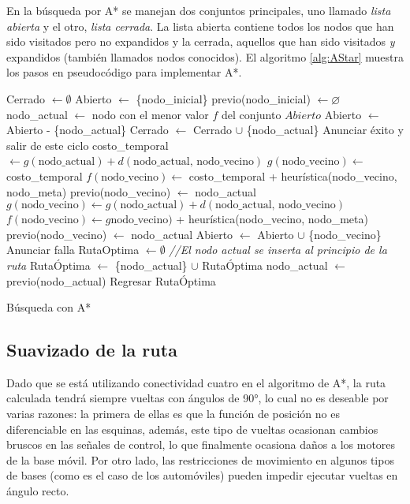 \documentclass[letterpaper,12pt]{article}
\begin{document}
En la búsqueda por A* se manejan dos conjuntos principales, uno llamado \textit{lista abierta} y el otro, \textit{lista cerrada}. La lista abierta contiene todos los nodos que han sido visitados pero no expandidos y la cerrada, aquellos que han sido visitados \textit{y} expandidos (también llamados nodos conocidos). El algoritmo \ref{alg:AStar} muestra los pasos en pseudocódigo para implementar A*. 
\begin{algorithm}
\DontPrintSemicolon
{}
Cerrado $\leftarrow \emptyset$\;
Abierto $\leftarrow$ \{nodo\_inicial\}\;
previo(nodo\_inicial) $\leftarrow \varnothing$\;
{
  nodo\_actual $\leftarrow$ nodo con el menor valor $f$ del conjunto $Abierto$\;
  Abierto $\leftarrow$ Abierto - \{nodo\_actual\}\;
  Cerrado $\leftarrow$ Cerrado $\cup$ \{nodo\_actual\}\;
  {
    Anunciar éxito y salir de este ciclo\;
  }
  {
    {
      costo\_temporal $\leftarrow g(\textrm{nodo\_actual}) + d(\textrm{nodo\_actual, nodo\_vecino})$\;
      {
        $g(\textrm{nodo\_vecino})\leftarrow$ costo\_temporal\;
        $f(\textrm{nodo\_vecino})\leftarrow$ costo\_temporal + heurística(nodo\_vecino, nodo\_meta)\;
        previo(nodo\_vecino) $\leftarrow$ nodo\_actual\;
      }
    }
    {
      $g(\textrm{nodo\_vecino})\leftarrow g(\textrm{nodo\_actual}) + d(\textrm{nodo\_actual, nodo\_vecino})$\;
      $f(\textrm{nodo\_vecino})\leftarrow g\textrm{nodo\_vecino})$  + heurística(nodo\_vecino, nodo\_meta)\;
      previo(nodo\_vecino) $\leftarrow$ nodo\_actual\;
      Abierto $\leftarrow$ Abierto $\cup$ \{nodo\_vecino\}\; 
    }
  }
}
{
  Anunciar falla\;
}
{
  RutaOptima $\leftarrow\emptyset$ \;
  {
    \textit{//El nodo actual se inserta al principio de la ruta}\;
    RutaÓptima $\leftarrow$ \{nodo\_actual\} $\cup$ RutaÓptima \;
    nodo\_actual $\leftarrow$ previo(nodo\_actual)\;
  }
  Regresar RutaÓptima
}
\caption{Búsqueda con A*}
\label{alg:AStar}
\end{algorithm}

\subsection{Suavizado de la ruta}
Dado que se está utilizando conectividad cuatro en el algoritmo de A*, la ruta calculada tendrá siempre vueltas con ángulos de 90°, lo cual no es deseable por varias razones: la primera de ellas es que la función de posición no es diferenciable en las esquinas, además, este tipo de vueltas ocasionan cambios bruscos en las señales de control, lo que finalmente ocasiona daños a los motores de la base móvil. Por otro lado, las restricciones de movimiento en algunos tipos de bases (como es el caso de los automóviles) pueden impedir ejecutar vueltas en ángulo recto.
\end{document}
